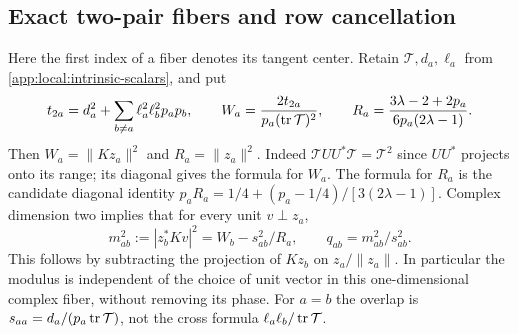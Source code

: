 \subsection{Exact two-pair fibers and row cancellation}
\label{app:local:two-pair}

Here the first index of a fiber denotes its tangent center. Retain
$\mathcal T,d_a,\ell_a$ from \eqref{app:local:intrinsic-scalars}, and put
\begin{gather}
 t_{2a}=d_a^2+\sum_{b\ne a}\ell_a^2\ell_b^2p_ap_b,\qquad
 W_a=\frac{2t_{2a}}{p_a(\operatorname{tr}\mathcal T)^2},\qquad
 R_a=\frac{3\lambda-2+2p_a}{6p_a(2\lambda-1)}.
 \label{app:local:physical-fiber-data}
\end{gather}
Then $W_a=\|Kz_a\|^2$ and $R_a=\|z_a\|^2$.
Indeed $\mathcal T UU^*\mathcal T=\mathcal T^2$ since $UU^*$ projects
onto its range; its diagonal gives the formula for $W_a$.
The formula for $R_a$ is the candidate diagonal identity
$p_aR_a=1/4+(p_a-1/4)/[3(2\lambda-1)]$.
Complex dimension two implies that for every unit $v\perp z_a$,
\begin{equation}\label{app:local:exact-physical-fiber}
 m_{ab}^2:=|z_b^*Kv|^2=W_b-s_{ab}^2/R_a,\qquad
 q_{ab}=m_{ab}^2/s_{ab}^2 .
\end{equation}
This follows by subtracting the projection of $Kz_b$ on
$z_a/\|z_a\|$. In particular the modulus is independent of the choice
of unit vector in this one-dimensional complex fiber, without removing
its phase. For $a=b$ the overlap is $s_{aa}=d_a/(p_a\operatorname{tr}\mathcal T)$,
not the cross formula $\ell_a\ell_b/\operatorname{tr}\mathcal T$.

